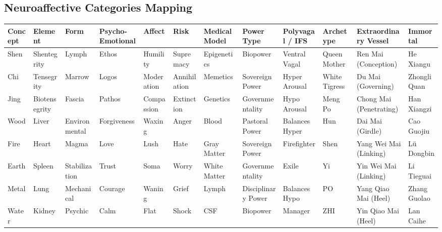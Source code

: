 \documentclass{article}
\begin{document}
\begin{landscape}

\section*{Neuroaffective Categories Mapping}

\begin{longtable}{|p{1.2cm}|p{1.8cm}|p{1.6cm}|p{2cm}|p{1.4cm}|p{1.5cm}|p{1.8cm}|p{1.8cm}|p{1.8cm}|p{2cm}|p{2.2cm}|p{1.8cm}|}
\hline
\textbf{Concept} & \textbf{Element} & \textbf{Form} & \textbf{Psycho-Emotional} & \textbf{Affect} & \textbf{Risk} & \textbf{Medical Model} & \textbf{Power Type} & \textbf{Polyvagal / IFS} & \textbf{Archetype} & \textbf{Extraordinary Vessel} & \textbf{Immortal} \\
\hline
Shen & Shentegrity & Lymph & Ethos & Humility & Supremacy & Epigenetics & Biopower & Ventral Vagal & Queen Mother & Ren Mai (Conception) & He Xiangu \\
Chi & Tensegrity & Marrow & Logos & Moderation & Annihilation & Memetics & Sovereign Power & Hyper Arousal & White Tigress & Du Mai (Governing) & Zhongli Quan \\
Jing & Biotensegrity & Fascia & Pathos & Compassion & Extinction & Genetics & Governmentality & Hypo Arousal & Meng Po & Chong Mai (Penetrating) & Han Xiangzi \\
Wood & Liver & Environmental & Forgiveness & Waxing & Anger & Blood & Pastoral Power & Balances Hyper & Hun & Dai Mai (Girdle) & Cao Guojiu \\
Fire & Heart & Magma & Love & Lush & Hate & Gray Matter & Sovereign Power & Firefighter & Shen & Yang Wei Mai (Linking) & Lü Dongbin \\
Earth & Spleen & Stabilization & Trust & Soma & Worry & White Matter & Governmentality & Exile & Yi & Yin Wei Mai (Linking) & Li Tieguai \\
Metal & Lung & Mechanical & Courage & Waning & Grief & Lymph & Disciplinary Power & Balances Hypo & PO & Yang Qiao Mai (Heel) & Zhang Guolao \\
Water & Kidney & Psychic & Calm & Flat & Shock & CSF & Biopower & Manager & ZHI & Yin Qiao Mai (Heel) & Lan Caihe \\
\hline
\end{longtable}

\end{landscape}
\end{document}
